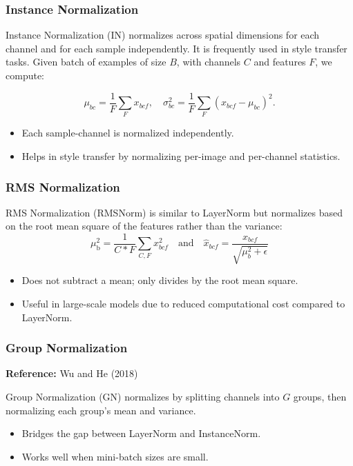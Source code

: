 \documentclass{article}
\begin{document}
\subsubsection{Instance Normalization}
\label{sec:instancenorm}

Instance Normalization (IN) normalizes across spatial dimensions for each channel and for each sample independently. It is frequently used in style transfer tasks. Given batch of examples of size $B$, with channels $C$ and features $F$, we compute:

\[
\mu_{bc} = \frac{1}{F} \sum_{F} x_{bcf}, 
\quad
\sigma^2_{bc} = \frac{1}{F} \sum_{F} (x_{bcf} - \mu_{bc})^2.
\]

\begin{itemize}
    \item Each sample-channel is normalized independently.
    \item Helps in style transfer by normalizing per-image and per-channel statistics.
\end{itemize}

\subsubsection{RMS Normalization}
\label{sec:rmsnorm}

RMS Normalization (RMSNorm) is similar to LayerNorm but normalizes based on the root mean square of the features rather than the variance:
\[
\mu_{\text{b}}^2 = \frac{1}{C*F} \sum_{C,F} x_{bcf}^2
\quad\text{and}\quad
\hat{x}_{bcf} = \frac{x_{bcf}}{\sqrt{\mu_b^2 + \epsilon}}
\]

\begin{itemize}
    \item Does not subtract a mean; only divides by the root mean square.
    \item Useful in large-scale models due to reduced computational cost compared to LayerNorm.
\end{itemize}

\subsubsection{Group Normalization}
\label{sec:groupnorm}

\textbf{Reference:} Wu and He (2018)

Group Normalization (GN) normalizes by splitting channels into $G$ groups, then normalizing each group’s mean and variance.

\begin{itemize}
    \item Bridges the gap between LayerNorm and InstanceNorm.
    \item Works well when mini-batch sizes are small.
\end{itemize}
\end{document}
